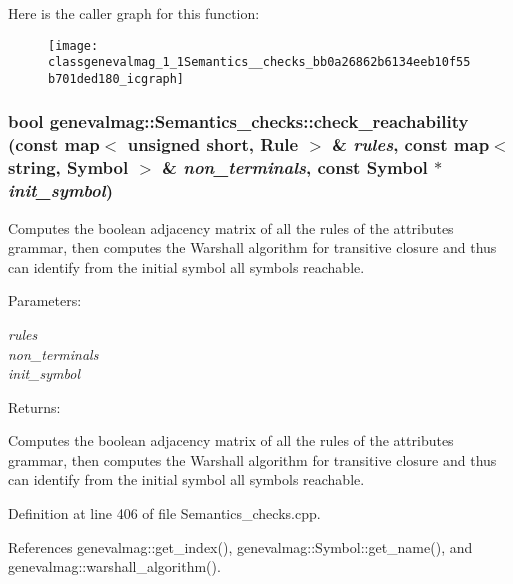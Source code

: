 Here is the caller graph for this function:\nopagebreak
\begin{figure}[H]
\begin{center}
\leavevmode
\texttt{[image: classgenevalmag\_1\_1Semantics\_\_checks\_bb0a26862b6134eeb10f55b701ded180\_icgraph]}
\end{center}
\end{figure}
\hypertarget{classgenevalmag_1_1Semantics__checks_6d2a6d53c499f3e7abbd19ecbc0d69d5}{
\subsubsection[{check\_\-reachability}]{\setlength{\rightskip}{0pt plus 5cm}bool genevalmag::Semantics\_\-checks::check\_\-reachability (const map$<$ unsigned short, {\bf Rule} $>$ \& {\em rules}, \/  const map$<$ string, {\bf Symbol} $>$ \& {\em non\_\-terminals}, \/  const {\bf Symbol} $\ast$ {\em init\_\-symbol})}}
\label{classgenevalmag_1_1Semantics__checks_6d2a6d53c499f3e7abbd19ecbc0d69d5}


Computes the boolean adjacency matrix of all the rules of the attributes grammar, then computes the Warshall algorithm for transitive closure and thus can identify from the initial symbol all symbols reachable.

\begin{Desc}
\item[Parameters:]
\begin{description}
\item[{\em rules}]\item[{\em non\_\-terminals}]\item[{\em init\_\-symbol}]\end{description}
\end{Desc}
\begin{Desc}
\item[Returns:]\end{Desc}
Computes the boolean adjacency matrix of all the rules of the attributes grammar, then computes the Warshall algorithm for transitive closure and thus can identify from the initial symbol all symbols reachable. 

Definition at line 406 of file Semantics\_\-checks.cpp.

References genevalmag::get\_\-index(), genevalmag::Symbol::get\_\-name(), and genevalmag::warshall\_\-algorithm().

